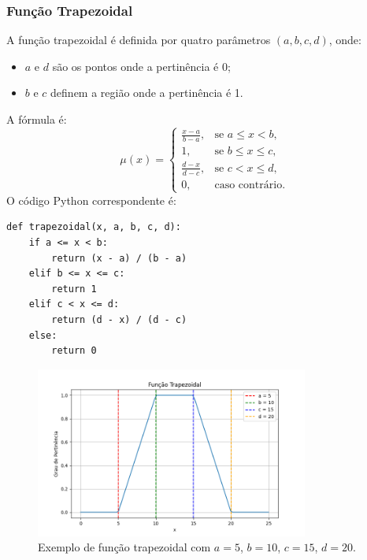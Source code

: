 \documentclass[a4paper,12pt]{article}
\begin{document}
\subsubsection{Função Trapezoidal}
A função trapezoidal é definida por quatro parâmetros $(a, b, c, d)$, onde:
\begin{itemize}
    \item $a$ e $d$ são os pontos onde a pertinência é 0;
    \item $b$ e $c$ definem a região onde a pertinência é 1.
\end{itemize}
A fórmula é:
\[
\mu(x) =
\begin{cases}
\frac{x - a}{b - a}, & \text{se } a \leq x < b, \\
1, & \text{se } b \leq x \leq c, \\
\frac{d - x}{d - c}, & \text{se } c < x \leq d, \\
0, & \text{caso contrário.}
\end{cases}
\]
O código Python correspondente é:
\begin{verbatim}
def trapezoidal(x, a, b, c, d):
    if a <= x < b:
        return (x - a) / (b - a)
    elif b <= x <= c:
        return 1
    elif c < x <= d:
        return (d - x) / (d - c)
    else:
        return 0
\end{verbatim}
\begin{figure}[H]
    \centering
    \includegraphics[width=0.8\textwidth]{img/trapezoidal.png}
    \caption{Exemplo de função trapezoidal com $a=5$, $b=10$, $c=15$, $d=20$.}
\end{figure}
\end{document}

